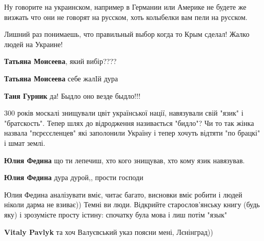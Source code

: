 \begin{itemize}

Ну говорите на украинском, например в Германии или Америке не будете же визжать
что они не говорят на русском, хоть колыбелки вам пели на русском.



Лишний раз понимаешь, что правильный выбор когда то Крым сделал! Жалко людей на Украине!

\begin{itemize}
\textbf{Татьяна Моисеева}, який вибір????

\textbf{Татьяна Моисеева} себе жалIй дура

\textbf{Таня Гурник} да! Быдло оно везде быдло!!!

300 років москалі знищували цвіт української нації, навязували свій "язик" і "братскость". Тепер шлях до відродження називається "бидло"? Чи то так жінка назвала "пєрєсєленцев" які заполонили Україну і тепер хочуть відтяти "по брацкі" і шмат землі.

\textbf{Юлия Федина} що ти лепечиш, хто кого знищував, хто кому язик навязував.

\textbf{Юлия Федина} дура дурой,, прости господи

Юлия Федина аналізувати вміє, читає багато, висновки вміє робити і людей ніколи дарма не взиває)) Темні ви люди. Відкрийте старослов'янську книгу (будь яку) і зрозумієте просту істину: спочатку була мова і лиш потім "язык"

\textbf{Vitaly Pavlyk} та хоч Валуєвський указ поясни мені, Лєнінград))


\end{itemize}
\end{itemize}
